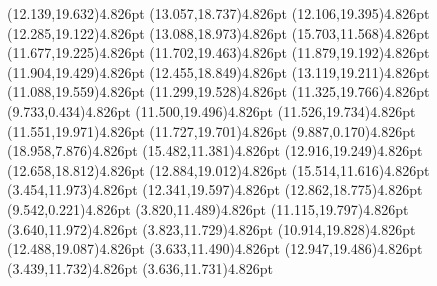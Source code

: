 \documentclass[10pt]{article}
\begin{document}
{{\qdisk(12.139,19.632){4.826pt}%
\qdisk(13.057,18.737){4.826pt}%
\dummycolor
\qdisk(12.106,19.395){4.826pt}%
\qdisk(12.285,19.122){4.826pt}%
\qdisk(13.088,18.973){4.826pt}%
\qdisk(15.703,11.568){4.826pt}%
\dummycolor
\qdisk(11.677,19.225){4.826pt}%
\qdisk(11.702,19.463){4.826pt}%
\qdisk(11.879,19.192){4.826pt}%
\qdisk(11.904,19.429){4.826pt}%
\qdisk(12.455,18.849){4.826pt}%
\qdisk(13.119,19.211){4.826pt}%
\dummycolor
\qdisk(11.088,19.559){4.826pt}%
\qdisk(11.299,19.528){4.826pt}%
\qdisk(11.325,19.766){4.826pt}%
\qdisk(9.733,0.434){4.826pt}%
\qdisk(11.500,19.496){4.826pt}%
\qdisk(11.526,19.734){4.826pt}%
\qdisk(11.551,19.971){4.826pt}%
\qdisk(11.727,19.701){4.826pt}%
\dummycolor
\qdisk(9.887,0.170){4.826pt}%
\qdisk(18.958,7.876){4.826pt}%
\dummycolor
\qdisk(15.482,11.381){4.826pt}%
\dummycolor
\qdisk(12.916,19.249){4.826pt}%
\dummycolor
\qdisk(12.658,18.812){4.826pt}%
\qdisk(12.884,19.012){4.826pt}%
\qdisk(15.514,11.616){4.826pt}%
\dummycolor
\qdisk(3.454,11.973){4.826pt}%
\qdisk(12.341,19.597){4.826pt}%
\qdisk(12.862,18.775){4.826pt}%
\dummycolor
\qdisk(9.542,0.221){4.826pt}%
\dummycolor
\qdisk(3.820,11.489){4.826pt}%
\qdisk(11.115,19.797){4.826pt}%
\dummycolor
\qdisk(3.640,11.972){4.826pt}%
\qdisk(3.823,11.729){4.826pt}%
\qdisk(10.914,19.828){4.826pt}%
\qdisk(12.488,19.087){4.826pt}%
\dummycolor
\qdisk(3.633,11.490){4.826pt}%
\qdisk(12.947,19.486){4.826pt}%
\dummycolor
\qdisk(3.439,11.732){4.826pt}%
\dummycolor
\qdisk(3.636,11.731){4.826pt}%
\dummycolor
}}
\end{document}

